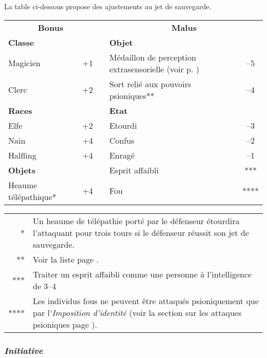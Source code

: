 \bigskip

La table ci-dessous propose des ajustements au jet de sauvegarde.

\bigskip

\begin{tabular}{lcclc}
\multicolumn{2}{c}{\textbf{Bonus}} && \multicolumn{2}{c}{\textbf{Malus}} \\
\textbf{Classe}     &       && \textbf{Objet}   & \\
Magicien            & +1    && Médaillon de perception extrasensorielle (voir p. \pageref{objet-medaillon-esp})     & --5 \\
Clerc               & +2    && Sort relié aux pouvoirs psioniques** & --4 \\
\textbf{Races}      &       && \textbf{Etat}     & \\
Elfe                & +2    && Etourdi           & --3 \\
Nain                & +4    && Confus            & --2 \\
Halfling            & +4    && Enragé            & --1 \\
\textbf{Objets}     &       && Esprit affaibli   & *** \\
Heaume télépathique* & +4    && Fou             & **** \\
\end{tabular}

\bigskip

\begin{tabular}{rp{15cm}}
\multicolumn{1}{r}{*}       & Un heaume de télépathie porté par le défenseur étourdira l'attaquant pour trois tours si le défenseur réussit son jet de sauvegarde. \\
\multicolumn{1}{r}{**}      & Voir la liste page \pageref{custom-liens-aptitudes-sorts}. \\
\multicolumn{1}{r}{***}     & Traiter un esprit affaibli comme une personne à l'intelligence de 3--4 \\
\multicolumn{1}{r}{****}    & Les individus fous ne peuvent être attaqués psioniquement que par l'\textit{Imposition d'identité} (voir la section sur les attaques psioniques page \pageref{custom-attaques}).
\end{tabular}

\subsubsection*{\textit{Initiative}}
\label{custom-surprise}

